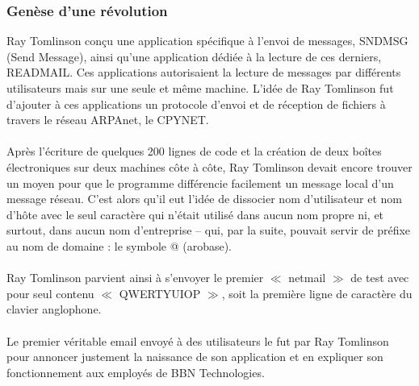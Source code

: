 \documentclass[french]{report}
\begin{document}
\subsubsection{\LARGE Genèse d’une révolution}
\LARGE Ray Tomlinson conçu une application spécifique à l’envoi de messages, SNDMSG (Send Message), ainsi qu’une application dédiée à la lecture de ces derniers, READMAIL. Ces applications autorisaient la lecture de messages par différents utilisateurs mais sur une seule et même machine. L’idée de Ray Tomlinson fut d’ajouter à ces applications un protocole d’envoi et de réception de fichiers à travers le réseau ARPAnet, le CPYNET.\\ \\
Après l’écriture de quelques 200 lignes de code et la création de deux boîtes électroniques sur deux machines côte à côte, Ray Tomlinson devait encore trouver un moyen pour que le programme différencie facilement un message local d’un message réseau. C’est alors qu’il eut l’idée de dissocier nom d’utilisateur et nom d’hôte avec le seul caractère qui n’était utilisé dans aucun nom propre ni, et surtout, dans aucun nom d’entreprise – qui, par la suite, pouvait servir de préfixe au nom de domaine : le symbole @ (arobase).\\ \\
Ray Tomlinson parvient ainsi à s’envoyer le premier $\ll$ netmail $\gg$ de test avec pour seul contenu $\ll$ QWERTYUIOP $\gg$, soit la première ligne de caractère du clavier anglophone.\\ \\
Le premier véritable email envoyé à des utilisateurs le fut par Ray Tomlinson pour annoncer justement la naissance de son application et en expliquer son fonctionnement aux employés de BBN Technologies.
\end{document}
